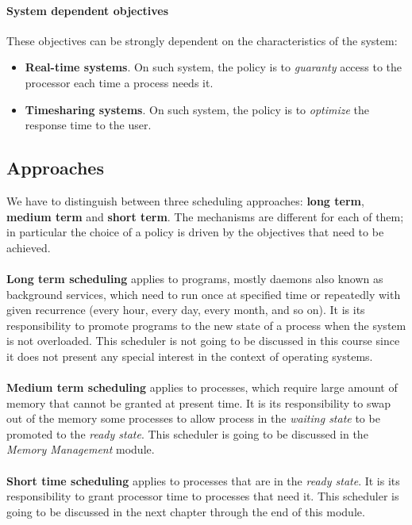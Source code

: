 \documentclass[11pt,a4paper]{scrreprt}
\begin{document}
\paragraph{System dependent objectives}
These objectives can be strongly dependent on the characteristics of the system:
\begin{itemize}
\item \textbf{Real-time systems}. On such system, the policy is to \textit{guaranty} access to the processor each time a process needs it.
\item \textbf{Timesharing systems}. On such system, the policy is to \textit{optimize} the response time to the user.
\end{itemize}

\subsection{Approaches}
We have to distinguish between three scheduling approaches: \textbf{long term}, \textbf{medium term} and \textbf{short term}. The mechanisms are different for each of them; in particular the choice of a policy is driven by the objectives that need to be achieved. \\\\
\textbf{Long term scheduling} applies to programs, mostly daemons also known as background services, which need to run once at specified time or repeatedly with given recurrence (every hour, every day, every month, and so on). It is its responsibility to promote programs to the new state of a process when the system is not overloaded. This scheduler is not going to be discussed in this course since it does not present any special interest in the context of operating systems.\\\\
\textbf{Medium term scheduling} applies to processes, which require large amount of memory that cannot be granted at present time. It is its responsibility to swap out of the memory some processes to allow process in the \textit{waiting state} to be promoted to the \textit{ready state}. This scheduler is going to be discussed in the \textit{Memory Management} module. \\\\
\textbf{Short time scheduling} applies to processes that are in the \textit{ready state}. It is its responsibility to grant processor time to processes that need it. This scheduler is going to be discussed in the next chapter through the end of this module.
\end{document}
